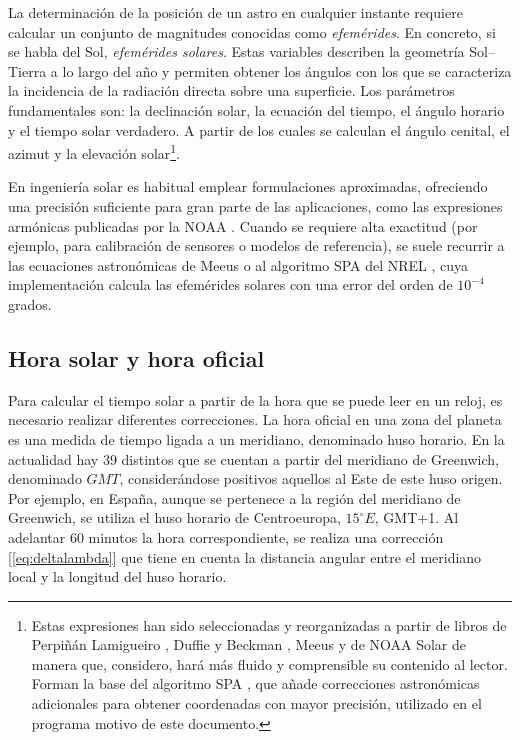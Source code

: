 La determinación de la posición de un astro en cualquier instante requiere calcular un conjunto de magnitudes conocidas como \textit{efemérides}. En concreto, si se habla del Sol, \textit{efemérides solares}. Estas variables describen la geometría Sol–Tierra a lo largo del año y permiten obtener los ángulos con los que se caracteriza la incidencia de la radiación directa sobre una superficie. Los parámetros fundamentales son: la declinación solar, la ecuación 
del tiempo, el ángulo horario y el tiempo solar verdadero. A partir de los cuales se calculan el ángulo cenital, el azimut y la elevación solar\footnote{Estas expresiones han sido seleccionadas y reorganizadas a partir de libros de Perpiñán Lamigueiro \cite{perpinan2013}, Duffie y Beckman \cite{duffie2020}, Meeus \cite{meeus1998} y de NOAA Solar \cite{noaa_solar} de manera que, considero, hará más fluido y comprensible su contenido al lector. Forman la base del algoritmo SPA \cite{reda2008spa}, que añade correcciones astronómicas adicionales para obtener coordenadas con mayor precisión, utilizado en el programa motivo de este documento.}.

En ingeniería solar es habitual emplear formulaciones aproximadas, ofreciendo una precisión suficiente para gran parte de las aplicaciones, como las expresiones armónicas publicadas por la NOAA \cite{noaa_solar}. Cuando se requiere alta exactitud (por ejemplo, para calibración de sensores o modelos de referencia), se suele recurrir a las ecuaciones astronómicas de Meeus \cite{meeus1998} o al algoritmo SPA del NREL \cite{reda2008spa}, cuya implementación calcula las efemérides solares con una error del orden de $10^{-4}$ grados.

\subsection{Hora solar y hora oficial}

Para calcular el tiempo solar a partir de la hora que se puede leer en un reloj, es necesario realizar diferentes correcciones.
La hora oficial en una zona del planeta es una medida de tiempo ligada a un meridiano, denominado huso horario. En la actualidad hay 39 distintos que se cuentan a partir del meridiano de Greenwich, denominado $GMT$, considerándose positivos aquellos al Este de este huso origen. Por ejemplo, en España, aunque se pertenece a la región del meridiano de Greenwich, se utiliza el huso horario de Centroeuropa, \( 15^\circ E\), GMT+1. Al adelantar 60 minutos la hora correspondiente, se realiza una corrección [\ref{eq:deltalambda}] que tiene en cuenta la distancia angular entre el meridiano local y la longitud del huso horario.

